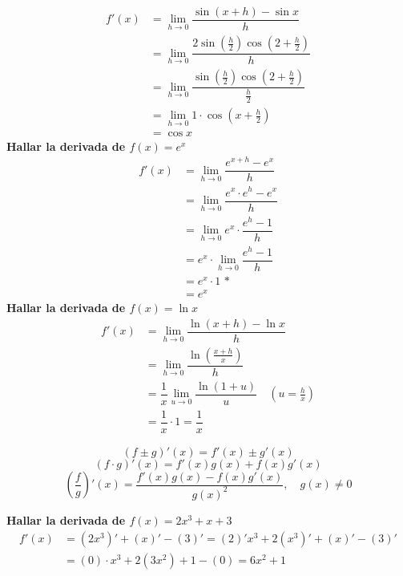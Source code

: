 \documentclass[12pt,a4paper,fleqn]{article}
\begin{document}
\begin{align*}
	f'(x) & =\lim_{h\to0}\dfrac{\sin (x+h)-\sin x}{h}                                \\
	      & =\lim_{h\to0}\dfrac{2\sin (\frac{h}{2})\cos (2+\frac{h}{2})}{h}          \\
	      & =\lim_{h\to0}\dfrac{\sin (\frac{h}{2})\cos (2+\frac{h}{2})}{\frac{h}{2}} \\
	      & =\lim_{h\to0}1\cdot\cos(x+\frac{h}{2})                                   \\
	      & =\cos x
\end{align*}
\textbf{Hallar la derivada de $f(x)= e^x$}
\begin{align*}
	f'(x) & = \lim_{h \to 0} \dfrac{e^{x+h} - e^x}{h}       \\
	      & = \lim_{h \to 0} \dfrac{e^x \cdot e^h - e^x}{h} \\
	      & = \lim_{h \to 0} e^x \cdot \dfrac{e^h - 1}{h}   \\
	      & = e^x \cdot \lim_{h \to 0} \dfrac{e^h - 1}{h}   \\
	      & = e^x \cdot 1 \text{ *}                         \\
	      & = e^x
\end{align*}
\textbf{Hallar la derivada de $f(x)= \ln x$}
\begin{align*}
	f'(x) & = \lim_{h \to 0} \dfrac{\ln(x+h) - \ln x}{h}                              \\
	      & = \lim_{h \to 0} \dfrac{\ln\left(\frac{x+h}{x}\right)}{h}                 \\
	      & = \dfrac{1}{x}\lim_{u \to 0} \dfrac{\ln (1+u)}{u} \quad (u = \frac{h}{x}) \\
	      & = \dfrac{1}{x}\cdot 1 = \dfrac{1}{x}
\end{align*}
\vspace{1em}
\begin{tcolorbox}[colback=white!95!blue, colframe=blue!40!black, title=Teoremas de Álgebra de Derivadas]
	\[
		(f \pm g)'(x) = f'(x) \pm g'(x)
	\]
	\[
		(f \cdot g)'(x) = f'(x) g(x) + f(x) g'(x)
	\]
	\[
		\left( \frac{f}{g} \right)'(x) = \frac{f'(x) g(x) - f(x) g'(x)}{g(x)^2}, \quad g(x) \neq 0
	\]
\end{tcolorbox}
\vspace{1em}
\noindent\textbf{Hallar la derivada de $f(x)= 2x^3 + x + 3$}
\begin{align*}
	f'(x) & = (2x^3)'+(x)'-(3)'=(2)'x^3 +2(x^3)'+(x)'-(3)' \\
	      & = (0)\cdot x^3 +2(3x^2)+1-(0)= 6x^2 + 1
\end{align*}
\end{document}
